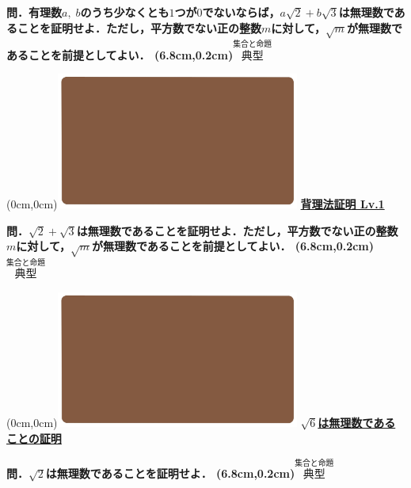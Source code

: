 \documentclass[10pt,
fleqn,
dvipdfmx,
uplatex
]{jsarticle}
\begin{document}
\normalsize 
\bf\boldmath 問．有理数$a,\;b$のうち少なくとも$1$つが$0$でないならば，$a\sqrt 2+b\sqrt 3$は無理数であることを証明せよ．ただし，平方数でない正の整数$m$に対して，$\sqrt m$が無理数であることを前提としてよい．
\at(6.8cm,0.2cm){\small\color{bradorange}$\overset{\text{集合と命題}}{\text{典型}}$}


\newpage



\at(0cm,0cm){\includegraphics[width=8cm,bb=0 0 1920 1080]{./youtube/thumbnails/templates/smart_background/集合と命題.jpeg}}
{\color{orange}\bf\boldmath\LARGE\underline{背理法証明 Lv.1 }}\vspace{0.3zw}

\Large 
\bf\boldmath 問．$\sqrt 2+\sqrt 3$は無理数であることを証明せよ．ただし，平方数でない正の整数$m$に対して，$\sqrt m$が無理数であることを前提としてよい．
\at(6.8cm,0.2cm){\small\color{bradorange}$\overset{\text{集合と命題}}{\text{典型}}$}


\newpage



\at(0cm,0cm){\includegraphics[width=8cm,bb=0 0 1920 1080]{./youtube/thumbnails/templates/smart_background/集合と命題.jpeg}}
{\color{orange}\bf\boldmath\Large\underline{$\sqrt 6$は無理数であることの証明}}\vspace{0.3zw}

\huge 
\bf\boldmath 問．$\sqrt 2$は無理数であることを証明せよ．
\at(6.8cm,0.2cm){\small\color{bradorange}$\overset{\text{集合と命題}}{\text{典型}}$}


\newpage
\end{document}
